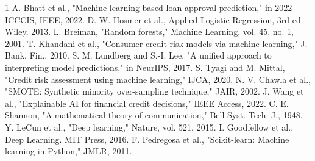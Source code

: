\documentclass[conference]{IEEEtran}
\begin{document}

\begin{thebibliography}{1}
 A. Bhatt et al., "Machine learning based loan approval prediction," in 2022 ICCCIS, IEEE, 2022.
 D. W. Hosmer et al., Applied Logistic Regression, 3rd ed. Wiley, 2013.
 L. Breiman, "Random forests," Machine Learning, vol. 45, no. 1, 2001.
 T. Khandani et al., "Consumer credit-risk models via machine-learning," J. Bank. Fin., 2010.
 S. M. Lundberg and S.-I. Lee, "A unified approach to interpreting model predictions," in NeurIPS, 2017.
 S. Tyagi and M. Mittal, "Credit risk assessment using machine learning," IJCA, 2020.
 N. V. Chawla et al., "SMOTE: Synthetic minority over-sampling technique," JAIR, 2002.
 J. Wang et al., "Explainable AI for financial credit decisions," IEEE Access, 2022.
 C. E. Shannon, "A mathematical theory of communication," Bell Syst. Tech. J., 1948.
 Y. LeCun et al., "Deep learning," Nature, vol. 521, 2015.
 I. Goodfellow et al., Deep Learning. MIT Press, 2016.
 F. Pedregosa et al., "Scikit-learn: Machine learning in Python," JMLR, 2011.
\end{thebibliography}
\end{document}
